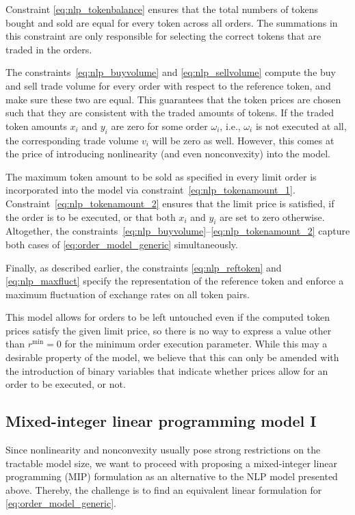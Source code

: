 \documentclass[11pt,parskip=full]{scrartcl}%
\newcommand*{\ie}{i.e., }
\newcommand*{\wrt}{with respect to }
\newcommand*{\Min}{\mathrm{min}}
\begin{document}
Constraint \eqref{eq:nlp_tokenbalance} ensures that the total numbers of tokens bought and sold are
equal for every token across all orders.
The summations in this constraint are only responsible for selecting the correct tokens that are
traded in the orders.

The constraints~\eqref{eq:nlp_buyvolume} and \eqref{eq:nlp_sellvolume} compute the buy and sell
trade volume for every order \wrt the reference token, and make sure these two are equal.
This guarantees that the token prices are chosen such that they are consistent with the traded
amounts of tokens.
If the traded token amounts $ x_i $ and $ y_i $ are zero for some order $ \omega_i $, \ie
$ \omega_i $ is not executed at all, the corresponding trade volume $ v_i $ will be zero as well.
However, this comes at the price of introducing nonlinearity (and even nonconvexity) into the
model.

The maximum token amount to be sold as specified in every limit order is incorporated into the
model via constraint~\eqref{eq:nlp_tokenamount_1}.
Constraint~\eqref{eq:nlp_tokenamount_2} ensures that the limit price is satisfied, if the order is
to be executed, or that both $ x_i $ and $ y_i $ are set to zero otherwise.
Altogether, the constraints~\eqref{eq:nlp_buyvolume}--\eqref{eq:nlp_tokenamount_2} capture both
cases of \eqref{eq:order_model_generic} simultaneously.

Finally, as described earlier, the constraints \eqref{eq:nlp_reftoken} and \eqref{eq:nlp_maxfluct}
specify the representation of the reference token and enforce a maximum fluctuation of exchange
rates on all token pairs.

This model allows for orders to be left untouched even if the computed token prices satisfy the
given limit price, so there is no way to express a value other than $ r^\Min = 0 $ for the
minimum order execution parameter.
While this may a desirable property of the model, we believe that this can only be amended with
the introduction of binary variables that indicate whether prices allow for an order to be
executed, or not.


\newpage
\subsection{Mixed-integer linear programming model I}
\label{subsec:MIP1}

Since nonlinearity and nonconvexity usually pose strong restrictions on the tractable model size,
we want to proceed with proposing a mixed-integer linear programming (MIP) formulation as an
alternative to the NLP model presented above.
Thereby, the challenge is to find an equivalent linear formulation for 
\eqref{eq:order_model_generic}.
\end{document}
